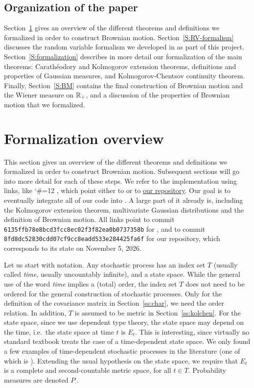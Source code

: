 \documentclass[lean]{Draft}
\makeatletter
\newcommand\leanlink{\begingroup\catcode`\#=12\relax\@leanlink}
\newcommand\@leanlink[2]{\endgroup
\href{#1}
{\texttt{\detokenize{#2}}}}
\newcommand{\mllink}[3]{%
\leanlink{https://github.com/leanprover-community/mathlib4/blob/6135ffb78e8bcd3fcc8ec02f3f82ea0b0737358b/Mathlib/#1.lean\##2}
{#3}}
\makeatother
\begin{document}
\subsection{Organization of the paper}

Section~\ref{S:overview} gives an overview of the different theorems and definitions we formalized in order to construct Brownian motion.
Section~\ref{S:RV-formalism} discusses the random variable formalism we developed in \mathlib as part of this project.
Section~\ref{S:formalization} describes in more detail our formalization of the main theorems: Carathéodory and Kolmogorov extension theorems, definitions and properties of Gaussian measures, and Kolmogorov-Chentsov continuity theorem.
Finally, Section~\ref{S:BM} contains the final construction of Brownian motion and the Wiener measure on $\mathbb{R}_+$, and a discussion of the properties of Brownian motion that we formalized.



\section{Formalization overview}\label{S:overview}
This section gives an overview of the different theorems and definitions we formalized in order to construct Brownian motion. Subsequent sections will go into more detail for each of these steps.
We refer to the implementation using links, like \mllink{Probability/Distributions/Gaussian/Basic}{L44-L47}{ProbabilityTheory.IsGaussian}, which point either to \mathlib or to \href{https://github.com/RemyDegenne/brownian-motion}{our repository}.
Our goal is to eventually integrate all of our code into \mathlib. A large part of it already is, including the Kolmogorov extension theorem, multivariate Gaussian distributions and the definition of Brownian motion.
All links point to commit {\tt 6135ffb78e8bcd3fcc8ec02f3f82ea0b0737358b} for \mathlib, and to commit {\tt 8fd8dc52830cdd07cf9cc8eadd533e284425fa6f} for our repository, which corresponds to its state on November 5, 2026.

Let us start with notation. Any stochastic process has an index set $T$ (usually called {\em time}, usually uncountably infinite), and a state space.
While the general use of the word {\em time} implies a (total) order, the index set $T$ does not need to be ordered for the general construction of stochastic processes. Only for the definition of the covariance matrix in Section~\ref{ss:char}, we need the order relation. In addition, $T$ is assumed to be metric in Section~\ref{ss:kolchen}. For the state space, since we use dependent type theory, the state space may depend on the time, i.e.\ the state space at time $t$ is $E_t$.
This is interesting, since virtually no standard textbook treats the case of a time-dependent state space. We only found a few examples of time-dependent stochastic processes in the literature (one of which is \cite{arnaudon2008brownian}).
Extending the usual hypothesis on the state space, we require that $E_t$ is a complete and second-countable metric space, for all $t \in T$. Probability measures are denoted $P_.$.
\end{document}
